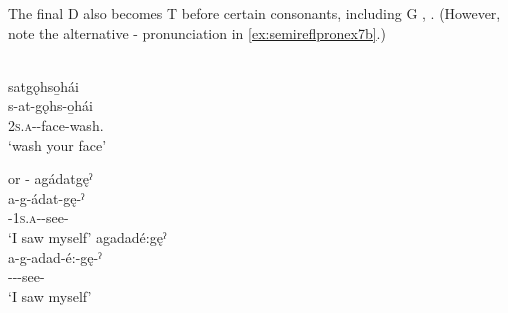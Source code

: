 The final D also becomes T before certain consonants, including G , . (However, note the alternative  {}-{\joinerE} pronunciation in \ref{ex:semireflpronex7b}.)

\ea\label{ex:semireflpronex6}   {\semireflexive}\\
\glll satgǫhso̱hái\\
s-at-gǫhs-o̱hái\\ 
\textsc{2s.a}-{\semireflexive}-face-wash.{\noaspect}\\
\glt  ‘wash your face’ 
\z

\ea\label{ex:semireflpronex7}  {} or  {}-{\joinerE}
\ea\label{ex:semireflpronex7a} agádatgęˀ\\
\gll a-g-ádat-gę-ˀ\\
  {\factual}-\textsc{1s.a}-{}-see-{\punctual}\\
\glt `I saw myself'
\ex agadadé:gęˀ\\\label{ex:semireflpronex7b}
\gll a-g-adad-é:-gę-ˀ\\
 {\factual}--{\joinerE}-see-{\punctual}\\
\glt `I saw myself'
\z
\z


